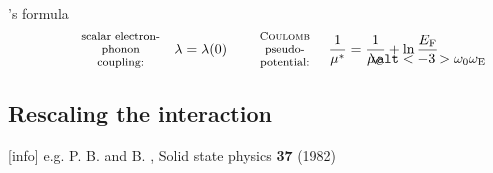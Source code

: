 \documentclass[10pt]{beamer}
\begin{document}
\begin{frame}[label=McMillan]{'s formula}
        \begingroup
            \color{titleblue}
            \hrulefill \vspace{-2mm}
            \begin{equation*}
                \begin{minipage}[c]{2cm}
                    \centering \footnotesize
                    scalar electron- \\
                    phonon coupling:
                \end{minipage}
                \quad
                \lambda = \lambda(0)
                \qquad
                \begin{minipage}[c]{15mm}
                    \centering \footnotesize
                    \name{Coulomb} \\
                    pseudo- \\
                    potential:
                \end{minipage}
                \quad
                \frac 1 {\mu^*} = \frac 1 {\mu \sub C} + \ln \frac
                    {E \sub F}
                    {\mathclap{\smash[b]{\alt<-3>{\omega_0}{\omega \sub E}}}}
            \end{equation*}
        \endgroup
        \vspace{-3mm}
    \end{frame}

    \subsection[\name{Coulomb} potential]
        {Rescaling the  interaction}

    [info]{%
        e.g. P. B.  and B. ,
        Solid state physics \textbf{37} (1982)}

    \newsavebox\RDOS

    \savebox\RDOS{\small}
    \savebox\CDOS{\small}

    \newsavebox\convergence
    \newsavebox\convergenceCDOS

    \savebox\convergence    {\small}
    \savebox\convergenceCDOS{\small}
\end{document}
